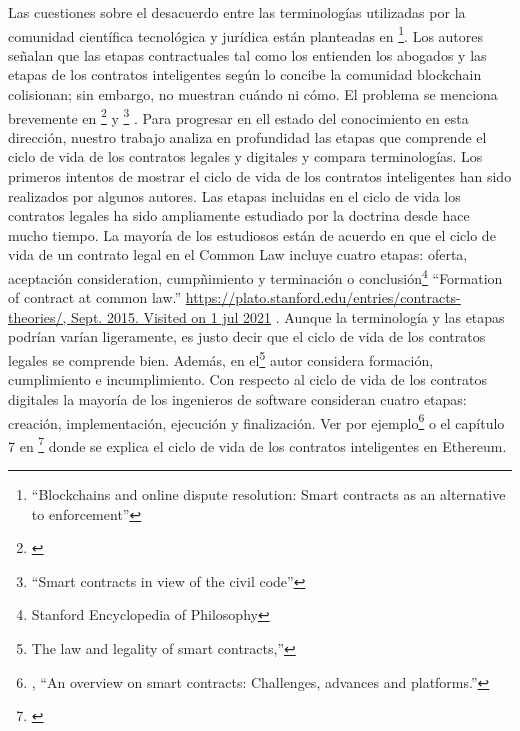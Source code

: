 \documentclass[12pt]{report} %
\begin{document}
\begin{itemize}
Las cuestiones sobre el desacuerdo entre las terminologías utilizadas por la comunidad científica tecnológica y jurídica están planteadas en \footnote{\cite{Riikka2016} “Blockchains and online dispute resolution: Smart contracts as an alternative to enforcement”}. Los autores señalan que las etapas contractuales tal como los entienden los abogados y las etapas de los contratos inteligentes según lo concibe la comunidad blockchain colisionan; sin embargo, no muestran cuándo ni cómo. El problema se menciona brevemente en \footnote{\cite{Christopher2019}} y \footnote{\cite{Monika2019}“Smart contracts in view of the civil code”} . Para progresar en ell estado del conocimiento en esta dirección, nuestro trabajo analiza en profundidad las etapas que comprende el ciclo de vida de los contratos legales y digitales y compara terminologías. Los primeros intentos de mostrar  el ciclo de vida de los contratos inteligentes han sido realizados por algunos autores. Las etapas incluidas en el ciclo de vida los contratos legales ha sido ampliamente estudiado por la doctrina desde hace mucho tiempo. La mayoría de los estudiosos están de acuerdo en que el ciclo de vida de un contrato legal en el Common Law incluye cuatro etapas: oferta, aceptación consideration, cumpñimiento y terminación o conclusión\footnote{Stanford Encyclopedia of Philosophy} “Formation of contract at common law.” \url{https://plato.stanford.edu/entries/contracts-theories/, Sept. 2015. Visited on 1 jul 2021} . Aunque la terminología y las etapas podrían varían ligeramente, es justo decir que el ciclo de vida de los contratos legales se comprende bien. Además, en  el\footnote{\cite{MaxRaskin2017}The law and legality of smart contracts,” } autor considera formación, cumplimiento e incumplimiento. Con respecto al ciclo de vida de los contratos digitales la mayoría de los ingenieros de software consideran cuatro etapas: creación, implementación, ejecución y finalización. Ver por ejemplo\footnote{\cite{Zibin2019} , “An overview on smart contracts: Challenges, advances and platforms.” }  o el capítulo 7 en \footnote{\cite{AndreasAntonopoulos2018}} donde se explica el ciclo de vida de los contratos inteligentes en Ethereum.

\end{itemize}
\end{document}
